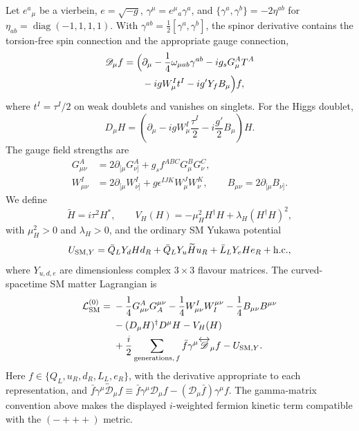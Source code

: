 \documentclass[epj]{svjour}
\begin{document}
Let \(e^a{}_\mu\) be a vierbein, \(e=\sqrt{-g}\),
\(\gamma^\mu=e^\mu{}_a\gamma^a\), and
\(\{\gamma^a,\gamma^b\}=-2\eta^{ab}\) for
\(\eta_{ab}=\operatorname{diag}(-1,1,1,1)\).
With \(\gamma^{ab}=\tfrac12[\gamma^a,\gamma^b]\), the spinor
derivative contains the torsion-free spin connection and the
appropriate gauge connection,
\begin{equation}
\begin{split}
\mathscr D_\mu f
=\Bigl(&\partial_\mu-\frac14\omega_{\mu ab}\gamma^{ab}
-i g_s G_\mu^A T^A\\
&-i g W_\mu^I t^I-i g'Y_f B_\mu\Bigr)f,
\end{split}
\label{eq:sm_spinor_derivative}
\end{equation}
where \(t^I=\tau^I/2\) on weak doublets and vanishes on singlets.
For the Higgs doublet,
\begin{equation}
D_\mu H =
\left(\partial_\mu-i g W_\mu^I\frac{\tau^I}{2}
-i\frac{g'}{2}B_\mu\right)H .
\end{equation}
The gauge field strengths are
\begin{align}
G_{\mu\nu}^A&=2\partial_{[\mu}G_{\nu]}^A
+g_s f^{ABC}G_\mu^B G_\nu^C,\nonumber\\
W_{\mu\nu}^I&=2\partial_{[\mu}W_{\nu]}^I
+g\epsilon^{IJK}W_\mu^J W_\nu^K,\qquad
B_{\mu\nu}=2\partial_{[\mu}B_{\nu]} .
\end{align}
We define
\begin{equation}
\widetilde H=i\tau^2H^*,\qquad
V_H(H)=-\mu_H^2H^\dagger H+\lambda_H(H^\dagger H)^2,
\end{equation}
with \(\mu_H^2>0\) and \(\lambda_H>0\), and the ordinary SM
Yukawa potential
\begin{equation}
U_{{\rm SM},Y}=
\bar Q_LY_dHd_R+\bar Q_LY_u\widetilde H u_R
+\bar L_LY_eHe_R+\mathrm{h.c.},
\label{eq:sm_yukawa_potential}
\end{equation}
where \(Y_{u,d,e}\) are dimensionless complex \(3\times3\)
flavour matrices. The curved-spacetime SM matter Lagrangian is
\begin{align}
\mathcal L_{\rm SM}^{(0)}={}&
-\frac14G_{\mu\nu}^AG_A^{\mu\nu}
-\frac14W_{\mu\nu}^IW_I^{\mu\nu}
-\frac14B_{\mu\nu}B^{\mu\nu}\nonumber\\
&-(D_\mu H)^\dagger D^\mu H-V_H(H)\nonumber\\
&+\frac{i}{2}\sum_{\text{generations},\,f}
\bar f\gamma^\mu\overleftrightarrow{\mathscr D}_\mu f
-U_{{\rm SM},Y}.
\label{eq:sm_curved_action}
\end{align}
Here \(f\in\{Q_L,u_R,d_R,L_L,e_R\}\), with the derivative
appropriate to each representation, and
\(\bar f\gamma^\mu\overleftrightarrow{\mathscr D}_\mu f
\equiv\bar f\gamma^\mu\mathscr D_\mu f
-(\mathscr D_\mu\bar f)\gamma^\mu f\).
The gamma-matrix convention above makes the displayed \(i\)-weighted
fermion kinetic term compatible with the \((-+++)\) metric.
\end{document}
